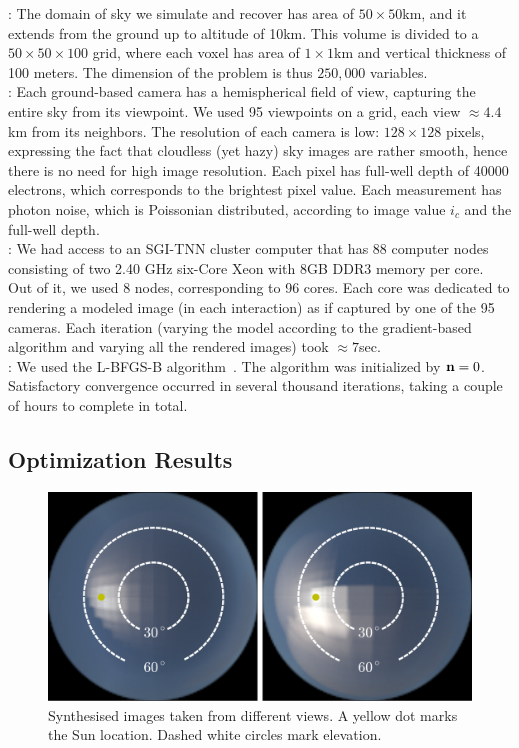 \documentclass[10pt,twocolumn,letterpaper]{article}
\newcommand{\yoavcomment}[1]{}
\renewcommand{\yoavcomment}[1]{#1} %
\begin{document}
: The domain of sky we simulate and recover has area of $50\times 50$km, and it extends from the ground up to altitude of 10km. This volume is divided to a $50\times50\times100$ grid, where each voxel has area of $1\times1$km and vertical thickness of 100 meters. The dimension of the problem is thus $250,000$ variables.\\

: Each ground-based camera has a hemispherical field of view, capturing the entire sky from its viewpoint. We used 95 viewpoints on a grid, each view $\approx 4.4$km from its neighbors.
The resolution of each camera is low: $128\times 128$ pixels, expressing the fact that cloudless (yet hazy) sky images are rather smooth, hence there is no need for high image resolution. Each pixel has full-well depth of 40000 electrons, which corresponds to the brightest pixel value. Each measurement has photon noise, which is Poissonian distributed, according to image value $i_c$ and the full-well depth.\\

: We had access to an SGI-TNN cluster computer that has 88 computer nodes consisting of two 2.40 GHz six-Core Xeon with 8GB
DDR3 memory per core. Out of it, we used 8 nodes, corresponding to 96 cores. Each core was dedicated to rendering a modeled image (in each interaction) as if captured by one of the 95 cameras. Each iteration (varying the model according to the gradient-based algorithm and varying all the rendered images) took $\approx 7$sec.\\

: We used the L-BFGS-B algorithm~\cite{BFGS}. The algorithm was initialized by ${\bf n}=0$. Satisfactory convergence occurred in several thousand iterations, taking a couple of hours to complete in total.


\subsection{Optimization Results}
\label{sec:optimization-results}
\begin{figure}
  \centering
  \yoavcomment{\includegraphics[width=0.8\columnwidth]{images/ref_images.pdf}}
  \caption{Synthesised images taken from different views. A yellow dot marks
    the Sun location. Dashed white circles mark elevation.}
  \label{fig:simulation-results1}
\end{figure}
\end{document}
